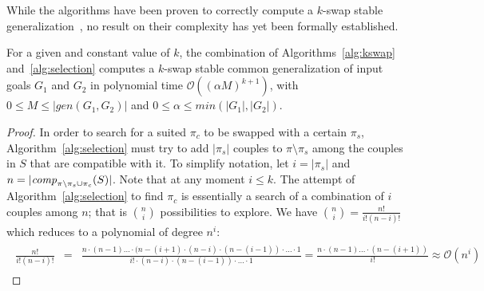While the algorithms have been proven to correctly compute a $k$-swap stable generalization~\cite{gen}, no result on their complexity has yet been formally established. 

\begin{theorem}\label{thm-k-swap-stable}
	For a given and constant value of $k$, the combination of Algorithms~\ref{alg:kswap} and~\ref{alg:selection} computes a $k$-swap stable common generalization of input goals $G_1$ and $G_2$ in polynomial time $\mathcal{O}((\alpha M)^{k+1})$, with $0 \le M \le |gen(G_1, G_2)|$ and $0 \le \alpha \le \textit{min}(|G_1|,|G_2|)$.
\end{theorem}
\begin{proof}
	In order to search for a suited $\pi_c$ to be swapped with a certain $\pi_s$, Algorithm~\ref{alg:selection} must try to add $|\pi_s|$ couples to $\pi\setminus\pi_s$ among the couples in $S$ that are compatible with it. To simplify notation, let $i = |\pi_s|$ and $n = |\mathit{comp}_{\pi\setminus\pi_s\cup\pi_c}(S)|$. Note that at any moment $i \le k$. The attempt of Algorithm~\ref{alg:selection} to find $\pi_c$ is essentially a search of a combination of $i$ couples among $n$; that is $\binom{n}{i}$ possibilities to explore. We have $\binom{n}{i} = \frac{n!}{i!(n-i)!}$ which reduces to a polynomial of degree $n^i$:
	\begin{gather*}
	\begin{array}{lll}
	\frac{n!}{i!(n-i)!} &=& \frac{n\cdot (n-1)\dots\cdot (n-(i+1) \cdot (n-i)\cdot (n-(i-1))\cdot\dots\cdot 1}{i!\cdot(n-i)\cdot (n-(i-1))\cdot\dots\cdot 1}
	= \frac{n\cdot (n-1)\dots\cdot (n-(i+1))}{i!}
	\approx \mathcal{O}(n^i)
	\end{array}
	\end{gather*}
	

\end{proof}
